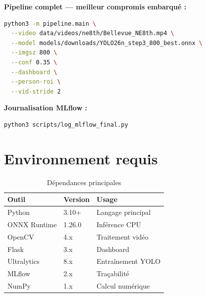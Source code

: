\textbf{Pipeline complet — meilleur
compromis embarqué :}

\begin{lstlisting}[language=bash]
python3 -m pipeline.main \
  --video data/videos/ne8th/Bellevue_NE8th.mp4 \
  --model models/downloads/YOLO26n_step3_800_best.onnx \
  --imgsz 800 \
  --conf 0.35 \
  --dashboard \
  --person-roi \
  --vid-stride 2
\end{lstlisting}

\textbf{Journalisation MLflow :}

\begin{lstlisting}[language=bash]
python3 scripts/log_mlflow_final.py
\end{lstlisting}

\section*{Environnement requis}

\begin{table}[H]
\centering
\caption{Dépendances principales}
\small
\begin{tabularx}{\textwidth}{lll}
\toprule
\textbf{Outil} &
\textbf{Version} &
\textbf{Usage} \\
\midrule
Python & 3.10+ & Langage principal \\
ONNX Runtime & 1.26.0 & Inférence CPU \\
OpenCV & 4.x & Traitement vidéo \\
Flask & 3.x & Dashboard \\
Ultralytics & 8.x & Entraînement YOLO \\
MLflow & 2.x & Traçabilité \\
NumPy & 1.x & Calcul numérique \\
\bottomrule
\end{tabularx}
\label{tab:dependencies}
\end{table}